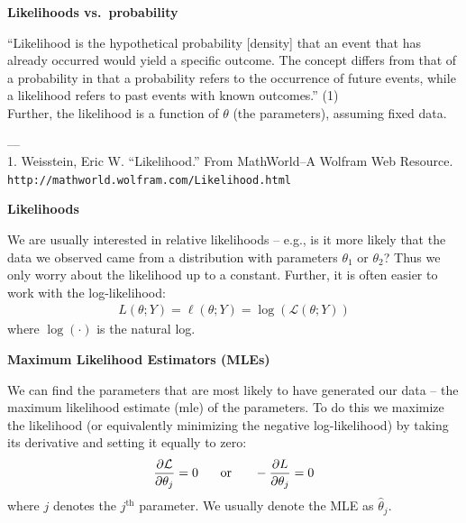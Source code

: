 \documentclass[12pt,xcolor=svgnames]{beamer}
\newcommand{\theme}{\color{FireBrick}}
\newcommand{\mc}[1]{\mathcal{#1}}
\newcommand{\mr}[1]{\mathrm{#1}}
\newcommand{\sk}{\vspace{.4cm}}
\newcommand{\chap}[1]{{\theme \Large \bf #1} \sk}
\newcommand{\mL}{\mc{L}}
\begin{document}
\begin{frame}
\chap{Likelihoods vs.~probability}

``Likelihood is the hypothetical probability [density] that an event that has already occurred would yield a specific outcome. The concept differs from that of a probability in that a probability refers to the occurrence of future events, while a likelihood refers to past events with known outcomes.'' (1) \\
\sk
Further, the likelihood is a function of $\theta$ (the parameters), assuming fixed data. 


\sk
 ---\\
 {\tiny 1. Weisstein, Eric W. ``Likelihood.'' From MathWorld--A Wolfram Web Resource. {\tt http://mathworld.wolfram.com/Likelihood.html} }

\end{frame}



\begin{frame}
\chap{Likelihoods}

We are usually interested in relative likelihoods -- e.g., is it more likely that the data we observed came from a distribution with parameters $\theta_1$ or $\theta_2$? Thus we only worry about the likelihood up to a constant. Further, it is often easier to work with the log-likelihood:
\begin{align*}
L(\theta; Y) = \ell(\theta; Y) = \log(\mL(\theta;Y))
\end{align*}
where $\log(\cdot)$ is the natural log. 

\end{frame}


\begin{frame}
\chap{Maximum Likelihood Estimators (MLEs)}

We can find the parameters that are most likely to have generated our data -- the maximum likelihood estimate (mle) of the parameters. To do this we maximize the likelihood (or equivalently minimizing the negative log-likelihood) by taking its derivative and setting it equally to zero:
\begin{align*}
\frac{\partial \mL}{\partial\theta_j} =0 \text{\hspace{0.5 cm} or \hspace{0.5 cm}}
-\frac{\partial L}{\partial \theta_j} = 0 
\end{align*}
where $j$ denotes the $j^{\mr{th}}$ parameter. We usually denote the MLE as $\hat{\theta}_j$.
\end{frame}
\end{document}

